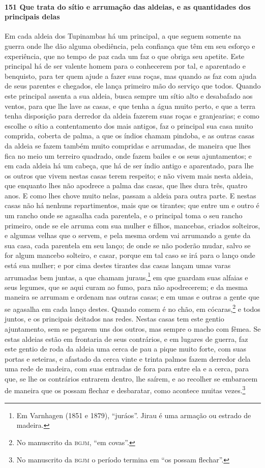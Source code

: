 \begin{linenumbers}
\paragraph{151 Que trata do sítio e arrumação das aldeias, e as quantidades dos principais
delas}\quad
Em cada aldeia dos Tupinambas há um principal, a que seguem somente na guerra onde lhe dão
alguma obediência, pela confiança que têm em seu esforço e experiência, que no tempo de
paz cada um faz o que obriga seu apetite. Este principal há de ser valente homem para o
conhecerem por tal, e aparentado e benquisto, para ter quem ajude a fazer suas roças, mas
quando as faz com ajuda de seus parentes e chegados, ele lança primeiro mão do serviço que
todos. Quando este principal assenta a sua aldeia, busca sempre um sítio alto e desabafado
aos ventos, para que lhe lave as casas, e que tenha a água muito perto, e que a terra
tenha disposição para derredor da aldeia fazerem suas roças e granjearias; e como escolhe
o sítio a contentamento dos mais antigos, faz o principal sua casa muito comprida, coberta
de palma, a que os índios chamam pindoba, e as outras casas da aldeia se fazem também
muito compridas e arrumadas, de maneira que lhes fica no meio um terreiro quadrado, onde
fazem bailes e os seus ajuntamentos; e em cada aldeia há um cabeça, que há de ser índio
antigo e aparentado, para lhe os outros que vivem nestas casas terem respeito; e não vivem
mais nesta aldeia, que enquanto lhes não apodrece a palma das casas, que lhes dura três,
quatro anos. E como lhes chove muito nelas, passam a aldeia para outra parte. E nestas
casas não há nenhuns repartimentos, mais que os tirantes; que entre um e outro é um rancho
onde se agasalha cada parentela, e o principal toma o seu rancho primeiro, onde se ele
arruma com sua mulher e filhos, mancebas, criados solteiros, e algumas velhas que o
servem, e pela mesma ordem vai arrumando a gente da sua casa, cada parentela em seu lanço;
de onde se não poderão mudar, salvo se for algum mancebo solteiro, e casar, porque em tal
caso se irá para o lanço onde está sua mulher; e por cima destes tirantes das casas lançam
umas varas arrumadas bem juntas, a que chamam juraus,\footnote{ Em Varnhagen (1851 e 1879),
``juráos''. Jirau é uma armação ou estrado de madeira.} em que guardam suas alfaias e
seus legumes, que se aqui curam ao fumo, para não apodrecerem; e da mesma maneira se
arrumam e ordenam nas outras casas; e em umas e outras a gente que se agasalha em cada
lanço destes. Quando comem é no chão, em cócaras,\footnote{ No manuscrito da
\textsc{bgjm}, ``em covas''.} e todos juntos, e os principais deitados nas redes. Nestas
casas tem este gentio ajuntamento, sem se pegarem uns dos outros, mas sempre o macho com
fêmea. Se estas aldeias estão em frontaria de seus contrários, e em lugares de guerra, faz
este gentio de roda da aldeia uma cerca de pau a pique muito forte, com suas portas e
seteiras, e afastado da cerca vinte e trinta palmos fazem derredor dela uma rede de
madeira, com suas entradas de fora para entre ela e a cerca, para que, se lhe os
contrários entrarem dentro, lhe saírem, e ao recolher se embaracem de maneira que os
possam flechar e desbaratar, como acontece muitas vezes.\footnote{ No manuscrito da
\textsc{bgjm} o período termina em ``os possam flechar''.}


\end{linenumbers}
